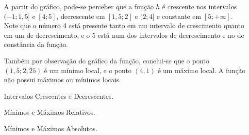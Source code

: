 \begin{solution}
    A partir do gráfico, pode-se perceber que a função $h$ é crescente nos intervalos $(-1;1{,}5]$ e $[4;5]$,
    decrescente em $[1,5; 2]$ e $(2;4]$ e constante em $[5;+\infty]$. 
    Note que o número 4 está presente tanto em um intervalo de crescimento quanto em um de decrescimento,
    e o 5 está num dos intervalos de decrescimento e no de constância da função.
    
    Também por observação do gráfico da função, conclui-se que o ponto $(1{,}5; 2{,}25)$ é um mínimo local, e o ponto $(4,1)$ é um máximo local.
    A função não possui máximos ou mínimos locais.
\end{solution}

\begin{onlineact}
    {Intervalos Crescentes e Decrescentes}.
\end{onlineact}

\begin{onlineact}
    {Mínimos e Máximos Relativos}.
\end{onlineact}

\begin{onlineact}
    {Mínimos e Máximos Absolutos}.
\end{onlineact}